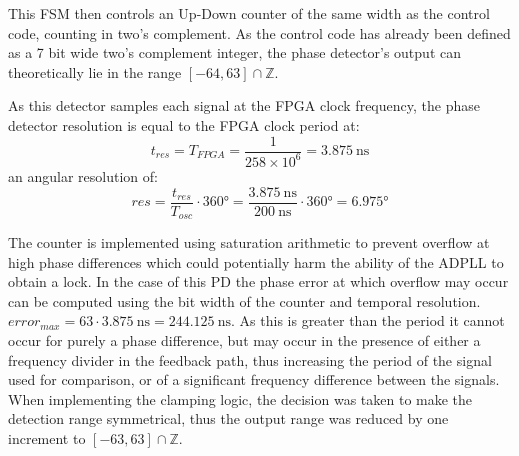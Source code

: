 This \ac{FSM} then controls an Up-Down counter of the same width as the control code, counting in two's complement. As the control code has already been defined as a 7 bit wide two's complement integer, the phase detector's output can theoretically lie in the range $[-64,63]\cap\mathbb{Z}$. 

As this detector samples each signal at the \ac{FPGA} clock frequency, the phase detector resolution is equal to the \ac{FPGA} clock period at:
\begin{equation}
t_{res} = T_{FPGA} = \frac{1}{258\times 10^{6}} = 3.875~\si{\nano\second}
\end{equation}
an angular resolution of:
\begin{equation}
res = \frac{t_{res}}{T_{osc}} \cdot 360\si{\degree} = \frac{3.875~\si{\nano\second}}{200~\si{\nano\second}} \cdot 360\si{\degree} = 6.975\si{\degree}
\end{equation}

The counter is implemented using saturation arithmetic to prevent overflow at high phase differences which could potentially harm the ability of the \ac{ADPLL} to obtain a lock. In the case of this \ac{PD} the phase error at which overflow may occur can be computed using the bit width of the counter and temporal resolution. $error_{max} = 63\cdot3.875~\si{\nano\second} = 244.125~\si{\nano\second}$. As this is greater than the period it cannot occur for purely a phase difference, but may occur in the presence of either a frequency divider in the feedback path, thus increasing the period of the signal used for comparison, or of a significant frequency difference between the signals. When implementing the clamping logic, the decision was taken to make the detection range symmetrical, thus the output range was reduced by one increment to $[-63,63]\cap\mathbb{Z}$.

